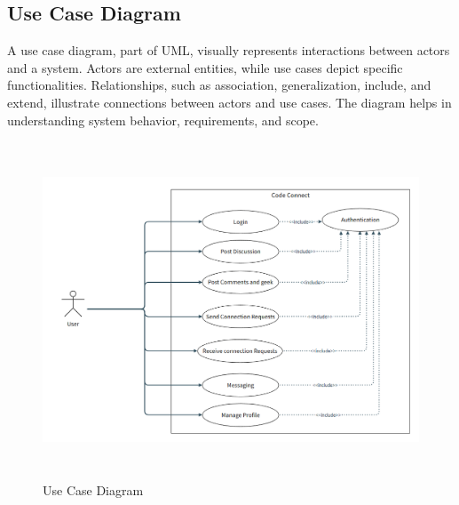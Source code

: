 \subsection{Use Case Diagram}
A use case diagram, part of UML, visually represents interactions between actors and a system. Actors are external entities, while use cases depict specific functionalities. Relationships, such as association, generalization, include, and extend, illustrate connections between actors and use cases. The diagram helps in understanding system behavior, requirements, and scope.
\begin{figure}[H]
    \includegraphics[height = 10cm]{Diagrams/use_case.png}
    \caption{Use Case Diagram}
\end{figure}
